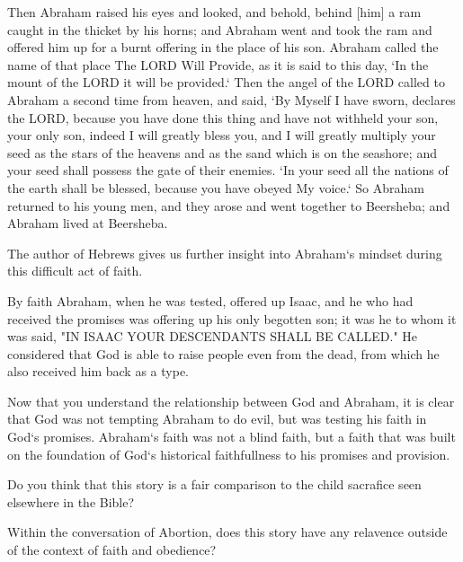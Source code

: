\begin{scripture}[Genesis 22:1-19]
    Then Abraham raised his 
    eyes and looked, and behold, behind [him] a ram caught in the thicket by his horns; and Abraham went and took the ram and offered him up for a burnt offering in the place of his son.
    Abraham called the name of that place The LORD Will Provide, as it is said to this day, `In the mount of the LORD it will be provided.`
    Then the angel of the LORD called to Abraham a second time from heaven,
    and said, `By Myself I have sworn, declares the LORD, because you have done this thing and have not withheld your son, your only son,
    indeed I will greatly bless you, and I will greatly multiply your seed as the stars of the heavens and as the sand which is on the seashore; and your seed shall possess the gate of their enemies.
    `In your seed all the nations of the earth shall be blessed, because you have obeyed My voice.`
    So Abraham returned to his young men, and they arose and went together to Beersheba; and Abraham lived at Beersheba.
\end{scripture}


\pagebreak
\begin{fullwidth}
    The author of Hebrews gives us further insight into Abraham`s mindset during this difficult act of faith. 
\end{fullwidth}

\vspace{1\baselineskip}

\begin{scripture}[Hebrews 11:17-19]
    By faith Abraham, when he was tested, 
    offered up Isaac, and he who had received the promises was offering up his only begotten son;
    it was he to whom it was said, "IN ISAAC YOUR DESCENDANTS SHALL BE CALLED."
    He considered that God is able to raise people even from the dead, from which he also received him back as a type.
\end{scripture}

\vspace{2\baselineskip}


\begin{fullwidth}
Now that you understand the relationship between God and Abraham, it is clear that God was not tempting Abraham to do evil, but was testing his faith in God`s promises.  
Abraham`s faith was not a blind faith, but a faith that was built on the foundation of God`s historical faithfullness to his promises and provision.
\vspace{1\baselineskip}

\noindent Do you think that this story is a fair comparison to the child sacrafice seen elsewhere in the Bible?

\vspace{5\baselineskip}
\noindent Within the conversation of Abortion, does this story have any relavence outside of the context of faith and obedience?
\end{fullwidth}

